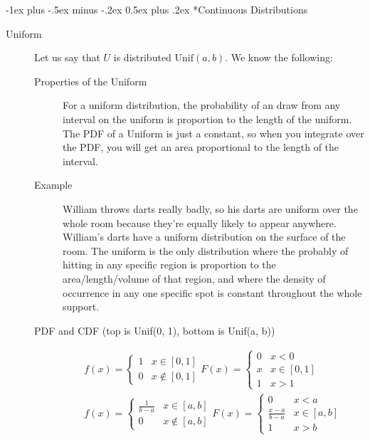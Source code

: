\documentclass[10pt,landscape]{article}
\makeatletter
\theoremstyle{definition}
\newcommand{\Unif}{\textrm{Unif}}
\renewcommand{\section}{\@startsection{section}{1}{0mm}%
                                {-1ex plus -.5ex minus -.2ex}%
                                {0.5ex plus .2ex}%
                                {\normalfont\large\bfseries}}
\makeatother
\begin{document}
\begin{multicols}{3}
\section*{Continuous Distributions}
\begin{description}
\item[Uniform] Let us say that $U$ is distributed $\Unif(a, b)$. We know the following:
\begin{description}
    \item[Properties of the Uniform] For a uniform distribution, the probability of an draw from any interval on the uniform is proportion to the length of the uniform. The PDF of a Uniform is just a constant, so when you integrate over the PDF, you will get an area proportional to the length of the interval.
    \item[Example] William throws darts really badly, so his darts are uniform over the whole room because they're equally likely to appear anywhere. William's darts have a uniform distribution on the surface of the room. The uniform is the only distribution where the probably of hitting in any specific region is proportion to the area/length/volume of that region, and where the density of occurrence in any one specific spot is constant throughout the whole support.
    \item[PDF and CDF (top is Unif(0, 1), bottom is Unif(a, b))]  
\begin{eqnarray*}
   f(x) = \left\{
     \begin{array}{lr}
       1 & x \in [0, 1] \\
       0 &  x \notin [0, 1]
     \end{array}
   \right.
   F(x) = \left\{
     \begin{array}{lr}
       0 & x < 0 \\
       x & x \in [0, 1] \\
       1 &  x > 1
     \end{array}
   \right.\\
   f(x) = \left\{
     \begin{array}{lr}
       \frac{1}{b-a} & x \in [a, b] \\
       0 &  x \notin [a, b]
     \end{array}
   \right.
   F(x) = \left\{
     \begin{array}{lr}
       0 & x < a \\
       \frac{x-a}{b-a} & x \in [a, b] \\
       1 &  x > b
     \end{array}
   \right. 
\end{eqnarray*}



\end{description}
\end{description}
\end{multicols}
\end{document}
